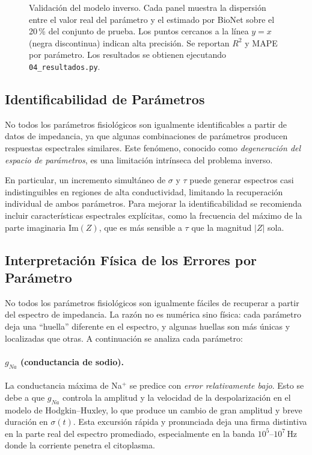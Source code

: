 \documentclass[12pt]{article}
\begin{document}
\begin{figure}[H]
\centering
{}
\caption{Validaci\'on del modelo inverso. Cada panel muestra la dispersi\'on entre
el valor real del par\'ametro y el estimado por BioNet sobre el 20\,\% del conjunto de prueba.
Los puntos cercanos a la l\'inea $y=x$ (negra discontinua) indican alta precisi\'on.
Se reportan $R^2$ y MAPE por par\'ametro. Los resultados se obtienen ejecutando
\texttt{04\_resultados.py}.}
\label{fig:scatter}
\end{figure}

\subsection{Identificabilidad de Par\'ametros}

\label{sec:identifiability}

No todos los par\'ametros fisiol\'ogicos son igualmente identificables a partir de datos de
impedancia, ya que algunas combinaciones de par\'ametros producen respuestas espectrales
similares. Este fen\'omeno, conocido como \emph{degeneraci\'on del espacio de par\'ametros},
es una limitaci\'on intr\'inseca del problema inverso.

En particular, un incremento simult\'aneo de $\sigma$ y $\tau$ puede generar espectros
casi indistinguibles en regiones de alta conductividad, limitando la recuperaci\'on
individual de ambos par\'ametros. Para mejorar la identificabilidad se recomienda incluir
caracter\'isticas espectrales expl\'icitas, como la frecuencia del m\'aximo de la parte
imaginaria $\text{Im}(Z)$, que es m\'as sensible a $\tau$ que la magnitud $|Z|$ sola.

\subsection{Interpretaci\'on F\'isica de los Errores por Par\'ametro}

No todos los par\'ametros fisiol\'ogicos son igualmente f\'aciles de recuperar a partir del
espectro de impedancia. La raz\'on no es num\'erica sino f\'isica: cada par\'ametro deja una
``huella'' diferente en el espectro, y algunas huellas son m\'as \'unicas y localizadas que
otras. A continuaci\'on se analiza cada par\'ametro:

\paragraph{$g_{Na}$ (conductancia de sodio).} La conductancia m\'axima de Na$^+$ se predice
con \emph{error relativamente bajo}. Esto se
debe a que $g_{Na}$ controla la amplitud y la velocidad de la despolarizaci\'on en el
modelo de Hodgkin--Huxley, lo que produce un cambio de gran amplitud y breve duraci\'on en
$\sigma(t)$. Esta excursi\'on r\'apida y pronunciada deja una firma distintiva en la parte real del
espectro promediado, especialmente en la banda $10^5$--$10^7\,\text{Hz}$ donde la
corriente penetra el citoplasma.
\end{document}
